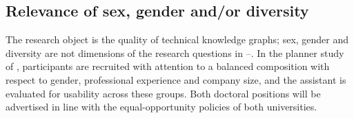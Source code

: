 \subsection{Relevance of sex, gender and/or diversity}

The research object is the quality of technical knowledge graphs; sex, gender and diversity are not dimensions of the research questions in --. In the planner study of , participants are recruited with attention to a balanced composition with respect to gender, professional experience and company size, and the assistant is evaluated for usability across these groups. Both doctoral positions will be advertised in line with the equal-opportunity policies of both universities. 
